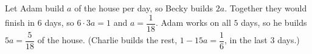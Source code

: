 Let Adam build $a$ of the house per day, so Becky builds $2a$. Together they would finish in $6$ days, so $6\cdot3a=1$ and $a=\dfrac1{18}$. Adam works on all $5$ days, so he builds $5a=\boxed{\dfrac5{18}}$ of the house. (Charlie builds the rest, $1-15a=\dfrac16$, in the last $3$ days.)
